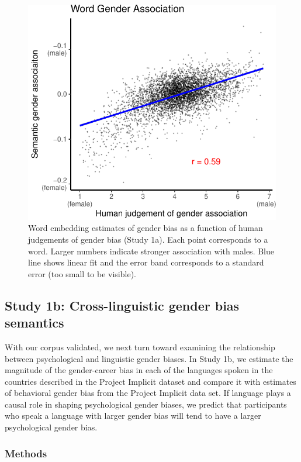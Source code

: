 \documentclass[man,floatsintext]{apa6}
\theoremstyle{definition}
\theoremstyle{definition}
\theoremstyle{definition}
\theoremstyle{remark}
\begin{document}
\begin{figure}
\centering
\includegraphics{iat_lang_files/figure-latex/unnamed-chunk-11-1.pdf}
\caption{\label{fig:unnamed-chunk-11}Word embedding estimates of gender bias
as a function of human judgements of gender bias (Study 1a). Each point
corresponds to a word. Larger numbers indicate stronger association with
males. Blue line shows linear fit and the error band corresponds to a
standard error (too small to be visible).}
\end{figure}

\subsection{Study 1b: Cross-linguistic gender bias
semantics}\label{study-1b-cross-linguistic-gender-bias-semantics}

With our corpus validated, we next turn toward examining the
relationship between psychological and linguistic gender biases. In
Study 1b, we estimate the magnitude of the gender-career bias in each of
the languages spoken in the countries described in the Project Implicit
dataset and compare it with estimates of behavioral gender bias from the
Project Implicit data set. If language plays a causal role in shaping
psychological gender biases, we predict that participants who speak a
language with larger gender bias will tend to have a larger
psychological gender bias.

\subsubsection{Methods}\label{methods-1}
\end{document}
